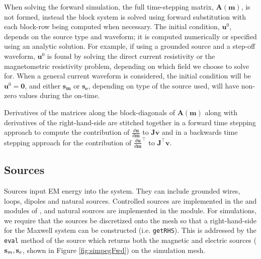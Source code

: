 When solving the forward simulation, the full time-stepping matrix,
$\mathbf{A}(\mathbf{m})$, is not formed, instead the block system is solved
using forward substitution with each block-row being computed when necessary.
The initial condition, $\mathbf{u}^{0}$, depends on the source type and
waveform; it is computed numerically or specified using an analytic
solution. For example, if using a grounded source and a step-off waveform,
$\mathbf{u}^{0}$ is found by solving the direct current resistivity or the
magnetometric resistivity problem, depending on which field we choose to solve for. When a general current waveform is
considered, the initial condition will be $\mathbf{u}^{0}=\mathbf{0}$, and either
$\mathbf{s_m}$ or $\mathbf{s_e}$, depending on type of the source used, will
have non-zero values during the on-time.

Derivatives of the matrices along the block-diagonals of
$\mathbf{A(m)}$ along with derivatives of the right-hand-side
are stitched together in a forward time stepping approach
to compute the contribution of $\frac{d\mathbf{u}}{d\mathbf{m}}$ to
$\mathbf{Jv}$ and in a backwards time stepping approach for the contribution
of $\frac{d\mathbf{u}}{d\mathbf{m}}^{\top}$ to $\mathbf{J}^{\top}\mathbf{v}$.


\subsection{Sources}
\label{sec:Sources}

Sources input EM energy into the system. They can include grounded wires,
loops, dipoles and natural sources. Controlled sources are implemented in the
\FDEM and \TDEM modules of \simpegEM, and natural sources are implemented in
the \NSEM module. For simulations, we require that the sources be discretized
onto the mesh so that a right-hand-side for the Maxwell system can be
constructed (i.e. \texttt{getRHS}). This is addressed by the \texttt{eval}
method of the source which returns both the magnetic and electric sources
($\mathbf{s}_m, \mathbf{s}_e$, shown in Figure \ref{fig:simpegFwd}) on the simulation mesh.

